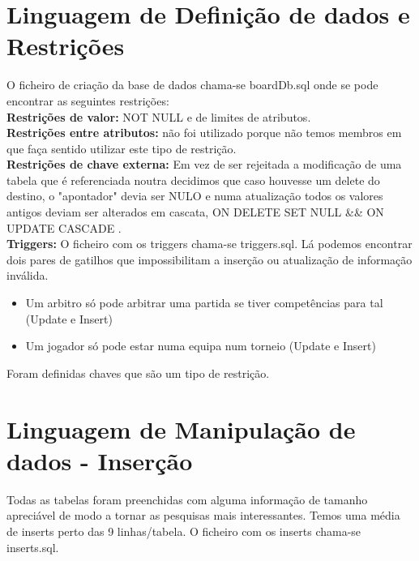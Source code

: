 \documentclass[a4paper]{article}
\begin{document}
\section{Linguagem de Definição de dados e Restrições}
O ficheiro de criação da base de dados chama-se boardDb.sql onde se pode encontrar as seguintes restrições:
\\\newline
\textbf{Restrições de valor:} NOT NULL e de limites de atributos. \\
\textbf{Restrições entre atributos:} não foi utilizado porque não temos membros em que faça sentido utilizar este tipo de restrição. \\
\textbf{Restrições de chave externa:} Em vez de ser rejeitada a modificação de uma tabela que é referenciada noutra decidimos que caso houvesse um delete do destino, o "apontador" devia ser NULO e numa atualização todos os valores antigos deviam ser alterados em cascata, ON DELETE SET NULL \&\& ON UPDATE CASCADE . \\
\textbf{Triggers:} O ficheiro com os triggers chama-se triggers.sql. Lá podemos encontrar dois pares de gatilhos que impossibilitam a inserção ou atualização de informação inválida.
\begin{itemize}
  \item Um arbitro só pode arbitrar uma partida se tiver competências para tal (Update e Insert)
  \item Um jogador só pode estar numa equipa num torneio (Update e Insert)
\end{itemize}

Foram definidas chaves que são um tipo de restrição. \\
\section{Linguagem de Manipulação de dados - Inserção}
Todas as tabelas foram preenchidas com alguma informação de tamanho apreciável de modo a tornar as pesquisas mais interessantes. Temos uma média de inserts perto das 9 linhas/tabela. O ficheiro com os inserts chama-se inserts.sql.

\end{document}
